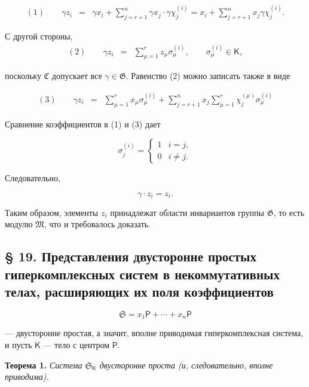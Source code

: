 \documentclass[11pt]{article}
\begin{document}
\[
\begin{array}{rcl}
(1)\qquad \gamma z_i
&=&\gamma x_i+\displaystyle\sum_{j=r+1}^{n}\gamma x_j\cdot \gamma\chi_j^{(i)}
=x_i+\displaystyle\sum_{j=r+1}^{n}x_j\gamma\chi_j^{(i)}.
\end{array}
\]

С другой стороны,
\[
\begin{array}{rcl}
(2)\qquad \gamma z_i&=&\displaystyle\sum_{\mu=1}^{r}z_\mu\sigma_\mu^{(i)},
\qquad \sigma_\mu^{(i)}\in\mathsf K,
\end{array}
\]

поскольку \(\mathfrak C\) допускает все \(\gamma\in\mathfrak G\). Равенство (2) можно записать также в виде

\[
\begin{array}{rcl}
(3)\qquad \gamma z_i
&=&\displaystyle\sum_{\mu=1}^{r}x_\mu\sigma_\mu^{(i)}
+\displaystyle\sum_{j=r+1}^{n}x_j\sum_{\mu=1}^{r}\chi_j^{(\mu)}\sigma_\mu^{(i)}
\end{array}
\]

Сравнение коэффициентов в (1) и (3) дает

\[
\sigma_j^{(i)}=
\begin{cases}
1 & i=j,\\
0 & i\ne j.
\end{cases}
\]

Следовательно,

\[
\gamma\cdot z_i=z_i.
\]

Таким образом, элементы \(z_i\) принадлежат области инвариантов группы \(\mathfrak G\), то есть модулю \(\mathfrak M\), что и требовалось доказать.

\subsection*{§ 19. Представления двусторонне простых гиперкомплексных систем в некоммутативных телах, расширяющих их поля коэффициентов}\label{darstellungen-zweiseitig-einfacher-hyperkomplexer-systeme-in-nichtkommutativen-erweiterungskoerpern-ihrer-koeffizientenkoerper}

\[
\mathfrak S=x_1\mathsf P+\cdots+x_n\mathsf P
\]

--- двусторонне простая, а значит, вполне приводимая гиперкомплексная система, и пусть \(\mathsf K\) --- тело с центром \(\mathsf P\).

\textbf{Теорема 1.} \emph{Система \(\mathfrak S_{\mathsf K}\) двусторонне проста (и, следовательно, вполне приводима).}
\end{document}
